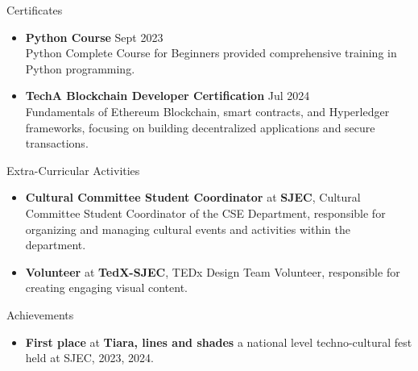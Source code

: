 \documentclass{resume} %
\begin{document}
\begin{rSection}{Certificates} 
    \begin{itemize}
        \item \textbf{Python Course} \hfill Sept 2023\\
        Python Complete Course for Beginners provided comprehensive training in Python programming.
        \item \textbf{TechA Blockchain Developer Certification} \hfill Jul 2024\\
        Fundamentals of Ethereum Blockchain, smart contracts, and Hyperledger frameworks, focusing on building decentralized applications and secure transactions.
    \end{itemize}
    
    
    \end{rSection}
    \begin{rSection}{Extra-Curricular Activities} 
\begin{itemize}
    \item 	\textbf{Cultural Committee Student Coordinator} at \textbf{SJEC}, Cultural Committee Student Coordinator of the CSE Department, responsible for organizing and managing cultural events and activities within the department.
    \item	\textbf{Volunteer} at \textbf{TedX-SJEC}, TEDx Design Team Volunteer, responsible for creating engaging visual content.

\end{itemize}


\end{rSection}

\begin{rSection}{Achievements} 
    \begin{itemize}
        \item 	\textbf{First place} at \textbf{Tiara, lines and shades} 
 a national level techno-cultural fest held at SJEC, 2023, 2024.
    
    \end{itemize}
    
    
    \end{rSection}
\end{document}
